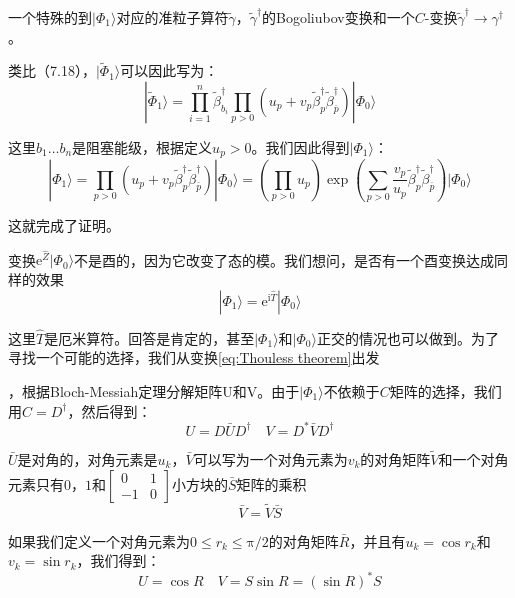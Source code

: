 一个特殊的到$|\Phi_{1}\rangle$对应的准粒子算符$\tilde{\gamma}$，$\tilde{\gamma}^{\dagger}$的Bogoliubov变换和一个$C$-变换$\tilde{\gamma}^{\dagger}\rightarrow\gamma^{\dagger}$。

类比（7.18），$|\tilde{\Phi}_{1}\rangle$可以因此写为：
\begin{equation}
|\tilde{\Phi}_{1}\rangle=\prod^{n}_{i=1}\tilde{\beta}^{\dagger}_{b_{i}}\prod_{p>0}(u_{p}+v_{p}\tilde{\beta}^{\dagger}_{p}\tilde{\beta}^{\dagger}_{\bar{p}})|\Phi_{0}\rangle\label{eq:Phi1 in caonnical basis}
\end{equation}

这里$b_{1}\dots b_{n}$是阻塞能级，根据定义$u_{p}>0$。我们因此得到$|\Phi_{1}\rangle$：
\[
|\Phi_{1}\rangle=\prod_{p>0}(u_{p}+v_{p}\tilde{\beta}^{\dagger}_{p}\tilde{\beta}^{\dagger}_{\bar{p}})|\Phi_{0}\rangle=(\prod_{p>0}u_{p})\exp\left(\sum_{p>0}\frac{v_{p}}{u_{p}}\tilde{\beta}^{\dagger}_{p}\tilde{\beta}^{\dagger}_{\bar{p}}\right)|\Phi_{0}\rangle
\]

这就完成了证明。

变换$\mathrm{e}^{\hat{Z}}|\Phi_{0}\rangle$不是酉的，因为它改变了态的模。我们想问，是否有一个酉变换达成同样的效果\cite{RS77b}
\[
|\Phi_{1}\rangle=\mathrm{e}^{\mathrm{i}\hat{T}}|\Phi_{0}\rangle
\]

这里$\hat{T}$是厄米算符。回答是肯定的，甚至$|\Phi_{1}\rangle$和$|\Phi_{0}\rangle$正交的情况也可以做到。为了寻找一个可能的选择，我们从变换\ref{eq:Thouless theorem}出发

，根据Bloch-Messiah定理分解矩阵U和V。由于$|\Phi_{1}\rangle$不依赖于$C$矩阵的选择，我们用$C=D^{\dagger}$，然后得到：
\[
U=D\bar{U}D^{\dagger}\quad V=D^{*}\bar{V}D^{\dagger}
\]

$\bar{U}$是对角的，对角元素是$u_{k}$，$\bar{V}$可以写为一个对角元素为$v_{k}$的对角矩阵$\tilde{V}$和一个对角元素只有$0$，$1$和$\left[\begin{smallmatrix}0 & 1\\
-1 & 0
\end{smallmatrix}\right]$小方块的$\bar{S}$矩阵的乘积
\[
\bar{V}=\tilde{V}\bar{S}
\]

如果我们定义一个对角元素为$0\leq r_{k}\leq\mathrm{\pi}/2$的对角矩阵$\bar{R}$，并且有$u_{k}=\cos r_{k}$和$v_{k}=\sin r_{k}$，我们得到：
\begin{equation}
U=\cos R\quad V=S\sin R=(\sin R)^{*}S\label{eq:UV RS}
\end{equation}

